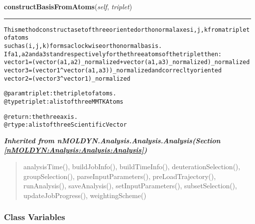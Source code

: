 \hspace{.8\funcindent}\begin{boxedminipage}{\funcwidth}

    \raggedright \textbf{constructBasisFromAtoms}(\textit{self}, \textit{triplet})

    \vspace{-1.5ex}

    \rule{\textwidth}{0.5\fboxrule}
\setlength{\parskip}{2ex}
\begin{alltt}
This method construct a set of three oriented orthonormal axes i, j, k from a triplet of atoms
such as (i,j,k) forms a clockwise orthonormal basis.
If a1, a2 and a3 stand respectively for the three atoms of the triplet then:
    vector1 = (vector(a1,a2)\_normalized + vector(a1,a3)\_normalized)\_normalized
    vector3 = (vector1 {\textasciicircum} vector(a1,a3))\_normalized and correclty oriented
    vector2 = (vector3 {\textasciicircum} vector1)\_normalized

@param triplet: the triplet of atoms.
@type triplet: a list of three MMTK Atoms

@return: the three axis.
@rtype: a list of three Scientific Vector   
\end{alltt}

\setlength{\parskip}{1ex}
    \end{boxedminipage}


\large{\textbf{\textit{Inherited from nMOLDYN.Analysis.Analysis.Analysis\textit{(Section \ref{nMOLDYN:Analysis:Analysis:Analysis})}}}}

\begin{quote}
analysisTime(), buildJobInfo(), buildTimeInfo(), deuterationSelection(), groupSelection(), parseInputParameters(), preLoadTrajectory(), runAnalysis(), saveAnalysis(), setInputParameters(), subsetSelection(), updateJobProgress(), weightingScheme()
\end{quote}


  \subsubsection{Class Variables}

